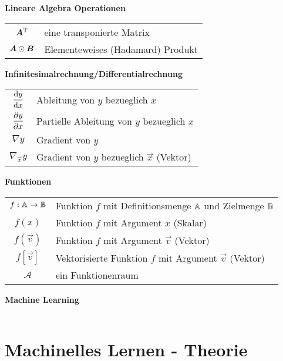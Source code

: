 \documentclass[../main]{subfiles}
\begin{document}
\begin{center}\textbf{Lineare Algebra Operationen}\end{center}
\begin{tabular}{cl}
  $\bm{A}^\mathrm{T}$ & eine transponierte Matrix \\
  $\bm{A} \odot \bm{B}$ & Elementeweises (Hadamard) Produkt \\

\end{tabular}

\begin{center}\textbf{Infinitesimalrechnung/Differentialrechnung}\end{center}
\begin{tabular}{cl}
  $\displaystyle\frac{\text{d}y}{\text{d}x}$ & Ableitung von $y$ bezueglich $x$ \\[2ex]
  $\displaystyle\frac{\partial y}{\partial x}$ & Partielle Ableitung von $y$ bezueglich $x$ \\[2ex]
  $\nabla y$ & Gradient von $y$\\
  $\nabla_{\vec{x}}y$ & Gradient von $y$ bezueglich $\vec{x}$ (Vektor) \\

\end{tabular}

\begin{center}\textbf{Funktionen}\end{center}
\begin{tabular}{cl}
  $f: \mathbb{A} \to \mathbb{B}$ & Funktion $f$ mit Definitionsmenge $\mathbb{A}$ und Zielmenge $\mathbb{B}$ \\
  $f(x)$ & Funktion $f$ mit Argument $x$ (Skalar) \\
  $f(\vec{v})$ & Funktion $f$ mit Argument $\vec{v}$ (Vektor) \\
  $f[\vec{v}]$ & Vektorisierte Funktion $f$ mit Argument $\vec{v}$ (Vektor) \\
  $\mathcal{A}$ & ein Funktionenraum \\

\end{tabular}

\begin{center}\textbf{Machine Learning}\end{center}
\begin{tabular}{cl}

\end{tabular}


\pagebreak
\section{Machinelles Lernen - Theorie}
\end{document}

